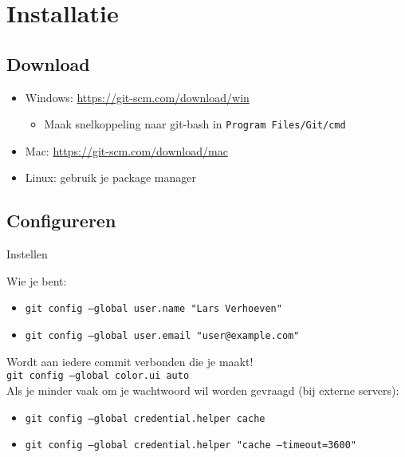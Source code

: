 \section{Installatie}

\subsection{Download}
\begin{frame}
	\begin{itemize}
		\item Windows: \url{https://git-scm.com/download/win}
			\begin{itemize}
				\item \small{Maak snelkoppeling naar git-bash in \tt{Program Files/Git/cmd}}
			\end{itemize}
		\item Mac: \url{https://git-scm.com/download/mac}
		\item Linux: gebruik je package manager
	\end{itemize}
\end{frame}

\subsection{Configureren}
\begin{frame}{Instellen}

	Wie je bent:
	\begin{itemize}
		\item \tt{git config --global user.name "Lars Verhoeven"}
		\item \tt{git config --global user.email "user@example.com"}
	\end{itemize}
	\alert{Wordt aan iedere commit verbonden die je maakt!}\\

	\texttt{git config --global color.ui auto}\\

	Als je minder vaak om je wachtwoord wil worden gevraagd (bij externe servers):

	\begin{itemize}
		\item \tt{git config --global credential.helper cache}
		\item \tt{git config --global credential.helper "cache --timeout=3600"}
	\end{itemize}
\end{frame}
